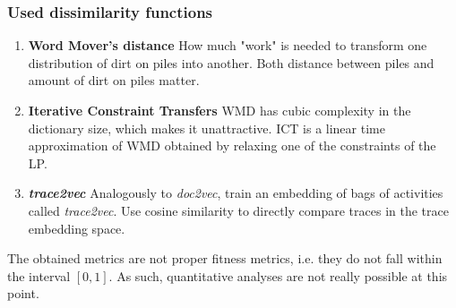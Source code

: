 \documentclass{beamer}
\begin{document}
	
	\begin{frame}
		\frametitle{Used dissimilarity functions}
		\begin{enumerate}
			\item \textbf{Word Mover's distance} \cite{KSKW15} How much "work" is needed to transform one distribution of dirt on piles into another. Both distance between piles and amount of dirt on piles matter.
			\item \textbf{Iterative Constraint Transfers} \cite{AtMi18} WMD has cubic complexity in the dictionary size, which makes it unattractive. ICT is a linear time approximation of WMD obtained by relaxing one of the constraints of the LP.
			\item \textbf{\emph{trace2vec}} \cite{KBWe18} Analogously to \emph{doc2vec}, train an embedding of bags of activities called \emph{trace2vec}. Use cosine similarity to directly compare traces in the trace embedding space.
		\end{enumerate}
	\alert{The obtained metrics are not proper fitness metrics, i.e. they do not fall within the interval $[0,1]$. As such, quantitative analyses are not really possible at this point.}
	\end{frame}
	
\end{document}
